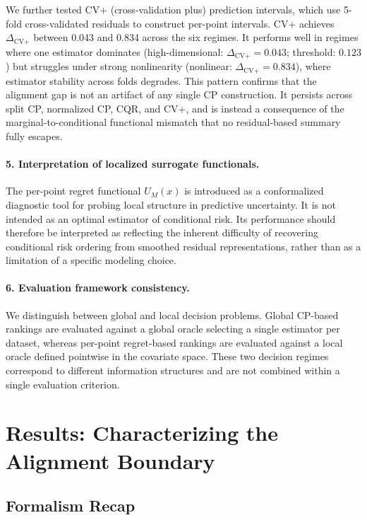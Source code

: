 \documentclass[a4paper,11pt]{article}
\begin{document}
We further tested CV+ (cross-validation plus) prediction intervals, which use 5-fold cross-validated residuals to construct per-point intervals. CV+ achieves $\Delta_{\text{CV+}}$ between 0.043 and 0.834 across the six regimes. It performs well in regimes where one estimator dominates (high-dimensional: $\Delta_{\text{CV+}} = 0.043$; threshold: $0.123$) but struggles under strong nonlinearity (nonlinear: $\Delta_{\text{CV+}} = 0.834$), where estimator stability across folds degrades. This pattern confirms that the alignment gap is not an artifact of any single CP construction. It persists across split CP, normalized CP, CQR, and CV+, and is instead a consequence of the marginal-to-conditional functional mismatch that no residual-based summary fully escapes.

\paragraph{5. Interpretation of localized surrogate functionals.}
The per-point regret functional $U_M(x)$ is introduced as a conformalized diagnostic tool for probing local structure in predictive uncertainty. It is not intended as an optimal estimator of conditional risk. Its performance should therefore be interpreted as reflecting the inherent difficulty of recovering conditional risk ordering from smoothed residual representations, rather than as a limitation of a specific modeling choice.

\paragraph{6. Evaluation framework consistency.}
We distinguish between global and local decision problems. Global CP-based rankings are evaluated against a global oracle selecting a single estimator per dataset, whereas per-point regret-based rankings are evaluated against a local oracle defined pointwise in the covariate space. These two decision regimes correspond to different information structures and are not combined within a single evaluation criterion.

\section{Results: Characterizing the Alignment Boundary}
\label{sec:results}

\subsection{Formalism Recap}
\end{document}
